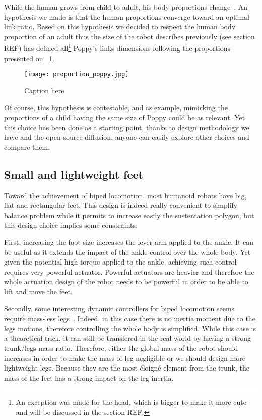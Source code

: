 While the human grows from child to adult, his body proportions change~\parencite{REF}. An hypothesis we made is that the human proportions converge toward an optimal link ratio. Based on this hypothesis we decided to respect the human body proportion of an adult thus the size of the robot describes previously (see section REF) has defined all\footnote{An exception was made for the head, which is bigger to make it more cute and will be discussed in the section REF.} Poppy's links dimensions following the proportions presented on \figurename~\ref{fig:poppy-human-proportion}.

\begin{figure}[tb]
    \begin{center}
        \texttt{[image: proportion\_poppy.jpg]}
    \end{center}
    \caption{Caption here}
    \label{fig:poppy-human-proportion}
\end{figure}

Of course, this hypothesis is contestable, and as example, mimicking the proportions of a child having the same size of Poppy could be as relevant. Yet this choice has been done as a starting point, thanks to design methodology we have and the open source diffusion, anyone can easily explore other choices and compare them.

\subsection{Small and lightweight feet} %

Toward the achievement of biped locomotion, most humanoid robots have big, flat and rectangular feet. This design is indeed really convenient to simplify balance problem while it permits to increase easily the sustentation polygon, but this design choice implies some constraints:

First, increasing the foot size increases the lever arm applied to the ankle. It can be useful as it extends the impact of the ankle control over the whole body. Yet given the potential high-torque applied to the ankle, achieving such control requires very powerful actuator.
Powerful actuators are heavier and therefore the whole actuation design of the robot needs to be powerful in order to be able to lift and move the feet.

Secondly, some interesting dynamic controllers for biped locomotion seems require mass-less legs~\parencite{REF}. Indeed, in this case there is no inertia moment due to the legs motions, therefore controlling the whole body is simplified. While this case is a theoretical trick, it can still be transfered in the real world by having a strong trunk/legs mass ratio. Therefore, either the global mass of the robot should increases in order to make the mass of leg negligible or we should design more lightweight legs.
Because they are the most éloigné element from the trunk, the mass of the feet has a strong impact on the leg inertia.

